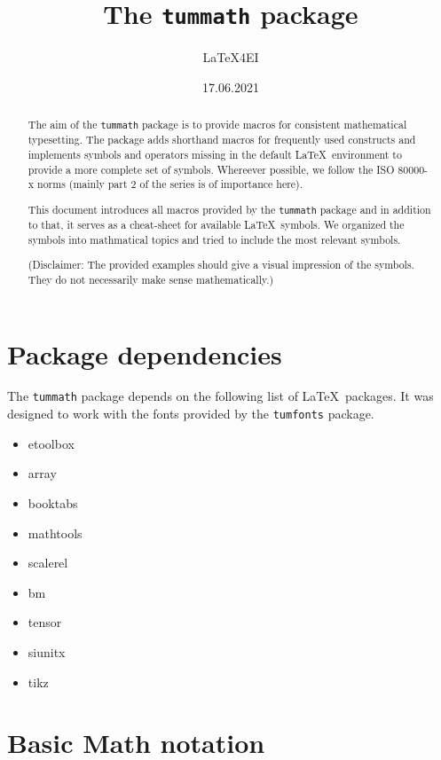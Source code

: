 \documentclass[DIV=13]{scrartcl}
\title{The \texttt{tummath} package}
\author{\LaTeX4EI}
\date{17.06.2021}
\begin{document}
\maketitle

\begin{abstract}
  The aim of the \texttt{tummath} package is to provide macros for consistent
  mathematical typesetting. The package adds shorthand macros for frequently
  used constructs and implements symbols and operators missing in the default
  \LaTeX\ environment to provide a more complete set of symbols.
  Whereever possible, we follow the ISO \num{80000}-x norms (mainly part 2 of
  the series is of importance here).

  This document introduces all macros provided by the \texttt{tummath}
  package and in addition to that, it serves as a cheat-sheet for available
  \LaTeX\ symbols. We organized the symbols into mathmatical topics and tried
  to include the most relevant symbols.

  (Disclaimer: The provided examples should give a visual impression of the
  symbols. They do not necessarily make sense mathematically.)
\end{abstract}

\begin{multicols*}{2}
  \tableofcontents
\end{multicols*}


\section{Package dependencies}
The \texttt{tummath} package depends on the following list of \LaTeX\
packages. It was designed to work with the fonts provided by the
\texttt{tumfonts} package.
\begin{multicols}{4}
  \begin{itemize}
    \item etoolbox
    \item array
    \item booktabs
    \item mathtools
    \item scalerel
    \item bm
    \item tensor
    \item siunitx
    \item tikz
  \end{itemize}
\end{multicols}


\section{Basic Math notation}
\end{document}
